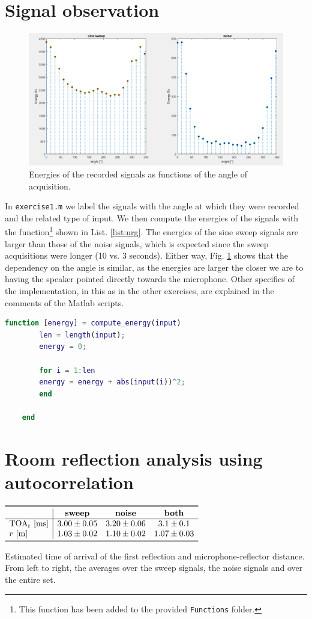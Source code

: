\documentclass[a4paper]{article}
\begin{document}
\section{Signal observation}
\begin{figure}[h]
	\centering
	\includegraphics[width=0.75\linewidth]{sig_energy.png}
	\caption{Energies of the recorded signals as functions of the angle of acquisition.}
	\label{fig:energy}
\end{figure}

In \verb|exercise1.m| we label the signals with the angle at which they were recorded and the related type of input. We then compute the energies of the signals with the function\footnote{This function has been added to the provided \texttt{Functions} folder.} shown in List. \ref{list:nrg}. The energies of the sine sweep signals are larger than those of the noise signals, which is expected since the sweep acquisitions were longer (10 vs. 3 seconds). Either way, Fig. \ref{fig:energy} shows that the dependency on the angle is similar, as the energies are larger the closer we are to having the speaker pointed directly towards the microphone. Other specifics of the implementation, in this as in the other exercises, are explained in the comments of the Matlab scripts.

\begin{lstlisting}[language=Matlab, caption=compute\_energy.m, label=list:nrg]
	function [energy] = compute_energy(input)
		len = length(input);
		energy = 0;
		
		for i = 1:len
		energy = energy + abs(input(i))^2;
		end
	
	end
\end{lstlisting}

\section{Room reflection analysis using autocorrelation}
\begin{table}[h!]
	\centering
	$\begin{array}{l|ccc}
		\toprule
		& \text{\textbf{sweep}} & \text{\textbf{noise}} & \text{\textbf{both}}\\
		\hline
		\text{TOA\textsubscript{r} [ms]} & 3.00 \pm 0.05 & 3.20 \pm 0.06 & 3.1 \pm  0.1 \\
		r\text{ [m]} & 1.03 \pm 0.02 & 1.10 \pm 0.02 & 1.07 \pm 0.03\\
		\bottomrule
	\end{array}$
	\caption{Estimated time of arrival of the first reflection and microphone-reflector distance. From left to right, the averages over the sweep signals, the noise signals and over the entire set.}
	\label{tab:refl}
\end{table}
\end{document}
